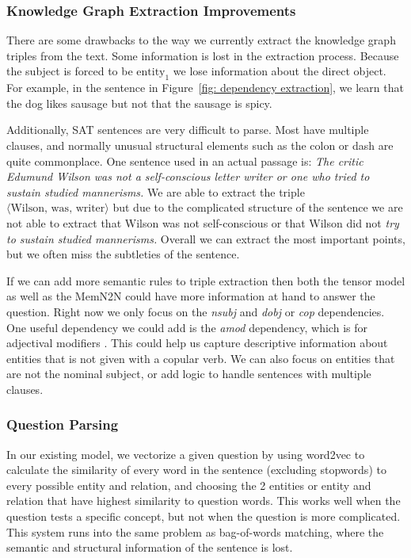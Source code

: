 \documentclass[pageno]{final_paper}
\begin{document}
\subsubsection{Knowledge Graph Extraction Improvements}
\label{Knowledge Graph Extraction Improvements}

There are some drawbacks to the way we currently extract the knowledge graph
triples from the text. Some information is lost in the extraction process.
Because the subject is forced to be $\text{entity}_1$ we lose information about
the direct object. For example, in the sentence in Figure~\ref{fig: dependency
extraction}, we learn that the dog likes sausage but not that the sausage is
spicy.

Additionally, SAT sentences are very difficult to parse. Most have multiple
clauses, and normally unusual structural elements such as the colon or dash are
quite commonplace. One sentence used in an actual passage is: \textit{The critic
Edumund Wilson was not a self-conscious letter writer or one who tried to
sustain studied mannerisms.} We are able to extract the triple $\langle
\text{Wilson}, \,\text{was}, \,\text{writer} \rangle$ but due to the complicated
structure of the sentence we are not able to extract that Wilson was not
self-conscious or that Wilson did not \textit{try to sustain studied
mannerisms.} Overall we can extract the most important points, but we often miss
the subtleties of the sentence.

If we can add more semantic rules to triple extraction then both the tensor
model as well as the MemN2N could have more information at hand to answer the
question. Right now we only focus on the \textit{nsubj} and \textit{dobj} or
\textit{cop} dependencies. One useful dependency we could add is the
\textit{amod} dependency, which is for adjectival modifiers \cite{De2014}. This
could help us capture descriptive information about entities that is not given
with a copular verb. We can also focus on entities that are not the nominal
subject, or add logic to handle sentences with multiple clauses.

\subsubsection{Question Parsing}
\label{Question Parsing}

In our existing model, we vectorize a given question by using word2vec to
calculate the similarity of every word in the sentence (excluding stopwords) to
every possible entity and relation, and choosing the 2 entities or entity and
relation that have highest similarity to question words. This works well when
the question tests a specific concept, but not when the question is more
complicated. This system runs into the same problem as bag-of-words matching,
where the semantic and structural information of the sentence is lost.
\end{document}
